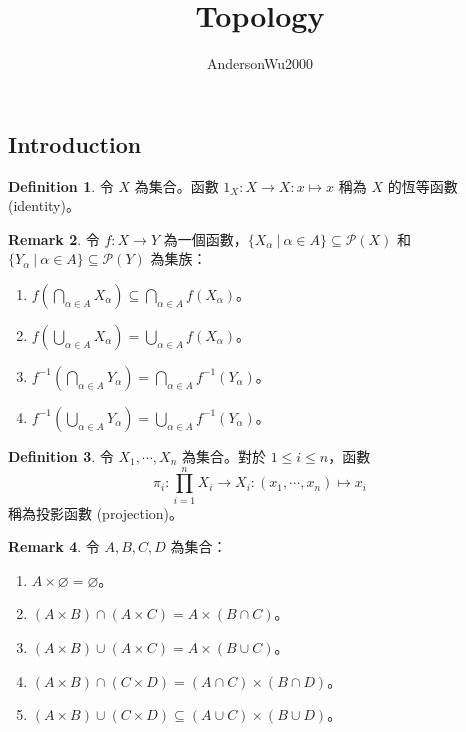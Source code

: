 \documentclass[12pt]{article}
\theoremstyle{definition}
\newtheorem{definition}{Definition}[section]
\newtheorem{remark}[definition]{Remark}
\newcommand\<{\langle}
\renewcommand\>{\rangle}
\begin{document}
\begin{CJK}{UTF8}{bsmi}

\title{Topology}
\author{AndersonWu2000}
\maketitle

\section{Introduction}

\begin{definition}
    令 $X$ 為集合。函數 $1_X:X\to X:x\mapsto x$ 稱為 $X$ 的恆等函數 (identity)。
\end{definition}

\begin{remark}
    令 $f:X\to Y$ 為一個函數，$\{X_\alpha\ |\ \alpha\in A\}\subseteq\mathcal{P}(X)$ 和 $\{Y_\alpha\ |\ \alpha\in A\}\subseteq\mathcal{P}(Y)$ 為集族：
    \begin{enumerate}
        \item $f(\bigcap_{\alpha\in A} X_\alpha)\subseteq\bigcap_{\alpha\in A}f(X_\alpha)$。
        \item $f(\bigcup_{\alpha\in A} X_\alpha)=\bigcup_{\alpha\in A}f(X_\alpha)$。
        \item $f^{-1}(\bigcap_{\alpha\in A} Y_\alpha)=\bigcap_{\alpha\in A}f^{-1}(Y_\alpha)$。
        \item $f^{-1}(\bigcup_{\alpha\in A} Y_\alpha)=\bigcup_{\alpha\in A}f^{-1}(Y_\alpha)$。
    \end{enumerate}
\end{remark}

\begin{definition}
    令 $X_1, \cdots, X_n$ 為集合。對於 $1\le i\le n$，函數 
    \[
        \pi_i:\prod_{i=1}^n X_i\to X_i:(x_1, \cdots, x_n)\mapsto x_i
    \]
    稱為投影函數 (projection)。
\end{definition}

\begin{remark}
\label{property of cartesian product}
    令 $A, B, C, D$ 為集合：
    \begin{enumerate}
        \item $A\times\varnothing=\varnothing$。
        \item $(A\times B)\cap(A\times C)=A\times(B\cap C)$。
        \item $(A\times B)\cup(A\times C)=A\times(B\cup C)$。
        \item $(A\times B)\cap(C\times D)=(A\cap C)\times(B\cap D)$。
        \item $(A\times B)\cup(C\times D)\subseteq(A\cup C)\times(B\cup D)$。
    \end{enumerate}
\end{remark}


\end{CJK}
\end{document}
